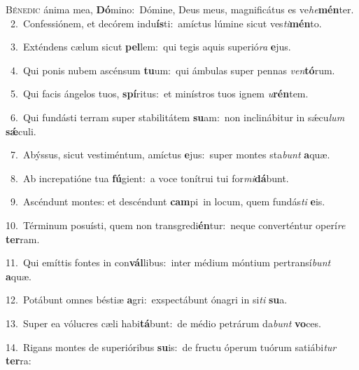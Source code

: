 \lettrine{\initial\textcolor{\initialcolor}{B}}{énedic} ánima mea, \textbf{Dó}\-mino:~\star Dómine, Deus meus, magnificátus es ve\-\textit{he}\-\textbf{mén}ter.\\
{\numbfont\textcolor{\numbcolor}{~2.}}~Confessiónem, et decórem indu\-\textbf{ís}\-ti:~\star amíctus lúmine sicut ves\-\textit{ti}\-\textbf{mén}to.\par
{\numbfont\textcolor{\numbcolor}{~3.}}~Exténdens cælum sicut \textbf{pel}\-lem:~\star qui tegis aquis superió\textit{ra} \textbf{e}\-jus.\par
{\numbfont\textcolor{\numbcolor}{~4.}}~Qui ponis nubem ascénsum \textbf{tu}\-um:~\star qui ámbulas super pennas \textit{ven}\-\textbf{tó}rum.\par
{\numbfont\textcolor{\numbcolor}{~5.}}~Qui facis ángelos tuos, \textbf{spí}\-ritus:~\star et minístros tuos ignem \textit{u}\-\textbf{rén}tem.\par
{\numbfont\textcolor{\numbcolor}{~6.}}~Qui fundásti terram super stabilitátem \textbf{su}\-am:~\star non inclinábitur in sǽcu\textit{lum} \textbf{sǽ}\-culi.\par
{\numbfont\textcolor{\numbcolor}{~7.}}~Abýssus, sicut vestiméntum, amíctus \textbf{e}\-jus:~\star super montes sta\textit{bunt} \textbf{a}\-quæ.\par
{\numbfont\textcolor{\numbcolor}{~8.}}~Ab increpatióne tua \textbf{fú}\-gient:~\star a voce tonítrui tui for\-\textit{mi}\-\textbf{dá}bunt.\par
{\numbfont\textcolor{\numbcolor}{~9.}}~Ascéndunt montes: et descéndunt \textbf{cam}\-pi~\star in locum, quem fundás\textit{ti} \textbf{e}\-is.\par
{\numbfont\textcolor{\numbcolor}{10.}}~Términum posuísti, quem non transgredi\-\textbf{én}\-tur:~\star neque converténtur operí\textit{re} \textbf{ter}\-ram.\par
{\numbfont\textcolor{\numbcolor}{11.}}~Qui emíttis fontes in con\-\textbf{vál}\-libus:~\star inter médium móntium pertransí\textit{bunt} \textbf{a}\-quæ.\par
{\numbfont\textcolor{\numbcolor}{12.}}~Potábunt omnes béstiæ \textbf{a}\-gri:~\star exspectábunt ónagri in si\textit{ti} \textbf{su}\-a.\par
{\numbfont\textcolor{\numbcolor}{13.}}~Super ea vólucres cæli habi\-\textbf{tá}\-bunt:~\star de médio petrárum da\textit{bunt} \textbf{vo}\-ces.\par
{\numbfont\textcolor{\numbcolor}{14.}}~Rigans montes de superióribus \textbf{su}\-is:~\star de fructu óperum tuórum satiábi\textit{tur} \textbf{ter}\-ra:\par
